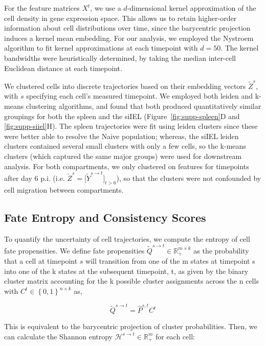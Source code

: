 For the feature matrices \(X^{t}\), we use a \(d\)-dimensional kernel approximation of the cell density in gene expression space. This allows us to retain higher-order information about cell distributions over time, since the barycentric projection induces a kernel mean embedding. For our analysis, we employed the Nystroem algorithm to fit kernel approximations at each timepoint with \(d = 50\). The kernel bandwidths were heuristically determined, by taking the median inter-cell Euclidean distance at each timepoint.

We clustered cells into discrete trajectories based on their embedding vectors \({\widetilde{Z}}^{s}\), with \(s\) specifying each cell's measured timepoint. We employed both leiden and k-means clustering algorithms, and found that both produced quantitatively similar groupings for both the spleen and the siIEL (Figure~\ref{fig:supp-spleen}D and \ref{fig:supp-siiel}H). The spleen trajectories were fit using leiden clusters since these were better able to resolve the Naive population; whereas, the siIEL leiden clusters contained several small clusters with only a few cells, so the k-means clusters (which captured the same major groups) were used for downstream analysis. For both compartments, we only clustered on features for timepoints after day 6 p.i. (i.e. \({\widetilde{Z}}^{s} = \lbrack{\widetilde{Y}}^{s \rightarrow t}\rbrack_{t > 6}\)), so that the clusters were not confounded by cell migration between compartments.

\subsection{Fate Entropy and Consistency Scores}

To quantify the uncertainty of cell trajectories, we compute the entropy of cell fate propensities. We define fate propensities \({\widetilde{Q}}^{s \rightarrow t} \in \mathbb{R}_{+}^{m \times k}\) as the probability that a cell at timepoint \(s\) will transition from one of the m states at timepoint s into one of the k states at the subsequent timepoint, t, as given by the binary cluster matrix accounting for the k possible cluster assignments across the n cells with \(C^{t} \in \left\{ 0,1 \right\}^{n \times k}\) as,

\[{\widetilde{Q}}^{s \rightarrow t} = {\widehat{P}}^{s,t}C^{t}\]

This is equivalent to the barycentric projection of cluster probabilities. Then, we can calculate the Shannon entropy \(\mathcal{H}^{s \rightarrow t} \in \mathbb{R}_{+}^{m}\) for each cell:

